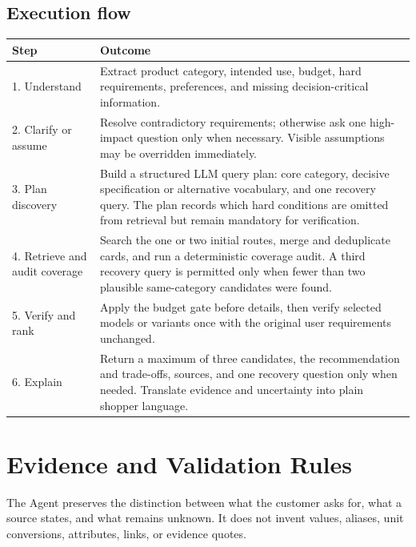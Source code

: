 \documentclass[11pt,letterpaper]{article}
\newcommand{\thead}[1]{\bfseries\centering #1\arraybackslash}
\begin{document}
\subsection{Execution flow}
\begin{tabularx}{\textwidth}{@{}p{1.35in}Y@{}}
\thead{Step} & \thead{Outcome} \\
. Understand & Extract product category, intended use, budget, hard requirements, preferences, and missing decision-critical information. \\
2. Clarify or assume & Resolve contradictory requirements; otherwise ask one high-impact question only when necessary. Visible assumptions may be overridden immediately. \\
3. Plan discovery & Build a structured LLM query plan: core category, decisive specification or alternative vocabulary, and one recovery query. The plan records which hard conditions are omitted from retrieval but remain mandatory for verification. \\
4. Retrieve and audit coverage & Search the one or two initial routes, merge and deduplicate cards, and run a deterministic coverage audit. A third recovery query is permitted only when fewer than two plausible same-category candidates were found. \\
5. Verify and rank & Apply the budget gate before details, then verify selected models or variants once with the original user requirements unchanged. \\
6. Explain & Return a maximum of three candidates, the recommendation and trade-offs, sources, and one recovery question only when needed. Translate evidence and uncertainty into plain shopper language. \\
\bottomrule
\end{tabularx}

\section{Evidence and Validation Rules}

The Agent preserves the distinction between what the customer asks for, what a source states, and what remains unknown. It does not invent values, aliases, unit conversions, attributes, links, or evidence quotes.
\end{document}
